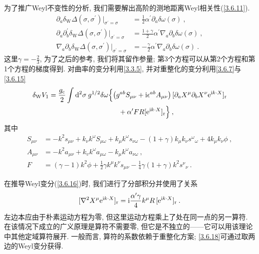 为了推广Weyl不变性的分析, 我们需要解出高阶的测地距离Weyl相关性(\ref{3.6.11}).
\begin{subequations}\label{3.6.15}
\begin{align}
\partial_{a} \delta_{\mathrm{W}} \Delta(\sigma, \sigma^{\prime})\Bigr\vert_{\sigma^{\prime}=\sigma}&=\frac{1}{2} \alpha^{\prime} \partial_{a} \delta \omega(\sigma) \:, \label{3.6.15a} \\
\partial_{a} \partial_{b}^{\prime} \delta_{\mathrm{W}} \Delta(\sigma, \sigma^{\prime})\Bigr\vert_{\sigma^{\prime}=\sigma}&=\frac{1+\gamma}{2} \alpha^{\prime} \nabla_{a} \partial_{b} \delta \omega(\sigma) \:, \label{3.6.15b} \\
\nabla_{a} \partial_{b} \delta_{\mathrm{W}} \Delta(\sigma, \sigma^{\prime})\Bigr\vert_{\sigma^{\prime}=\sigma}&=-\frac{\gamma}{2} \alpha^{\prime} \nabla_{a} \partial_{b} \delta \omega(\sigma) \:. \label{3.6.15c}
\end{align}
\end{subequations}
这里$\gamma=-\frac{2}{3}$, 为了之后的参考, 我们将其留作参量; 第3个方程可以从第2个方程和第1个方程的梯度得到. 对曲率的变分利用\eqref{3.3.5}, 并对重整化的变分利用\eqref{3.6.7}与\eqref{3.6.15} 
\begin{align}
\delta_{\mathrm{W}} V_{1}&=\frac{g_{\mathrm{c}}}{2} \int \mathrm{d}^{2} \sigma\: g^{1 / 2} \delta \omega\Bigl\{\left(g^{a b} S_{\mu \nu}+\mathrm{i} \epsilon^{a b} A_{\mu \nu}\right)[\partial_{a} X^{\mu} \partial_{b} X^{\nu} \mathrm{e}^{\mathrm{i} k \cdot X}]_{\mathrm{r}}  \nonumber \\
&\qquad \qquad\qquad\qquad \qquad  +\alpha^{\prime} F R[\mathrm{e}^{\mathrm{i} k \cdot X}]_{\mathrm{r}}\Bigr\} \:, \label{3.6.16}
\end{align}
其中
\begin{subequations}
\begin{align}
S_{\mu \nu}&=-k^{2} s_{\mu \nu}+k_{\nu} k^{\omega} S_{\mu \omega}+k_{\mu} k^{\omega} s_{\nu \omega}-(1+\gamma) k_{\mu} k_{\nu} s^{\omega}{}_{\omega}+4 k_{\mu} k_{\nu} \phi \:,\label{3.6.17a} \\
A_{\mu \nu}&=-k^{2} a_{\mu \nu}+k_{v} k^{\omega} a_{\mu \omega}-k_{\mu} k^{\omega} a_{\nu \omega} \:, \label{3.6.17b} \\
F&=(\gamma-1) k^{2} \phi+\frac{1}{2} \gamma k^{\mu} k^{\nu} s_{\mu \nu}-\frac{1}{4} \gamma(1+\gamma) k^{2} s^{\nu}{}_{\nu}  \:. \label{3.6.17c}
\end{align}
\end{subequations}

在推导Weyl变分(\ref{3.6.16})时, 我们进行了分部积分并使用了关系
\begin{equation}\label{3.6.18}
[\nabla^{2} X^{\mu} \mathrm{e}^{\mathrm{i} k \cdot X}]_{\mathrm{r}}=\mathrm{i} \frac{\alpha^{\prime} \gamma}{4} k^{\mu} R\,[\mathrm{e}^{\mathrm{i} k \cdot X}]_{\mathrm{r}} \:.
\end{equation}
左边本应由于朴素运动方程为零, 但这里运动方程乘上了处在同一点的另一算符. 在该情况下成立的广义原理是算符不需要零, 但它是不独立的——它可以用该理论中其他定域算符展开. 一般而言, 算符的系数依赖于重整化方案; \eqref{3.6.18}可通过取两边的Weyl变分获得.

